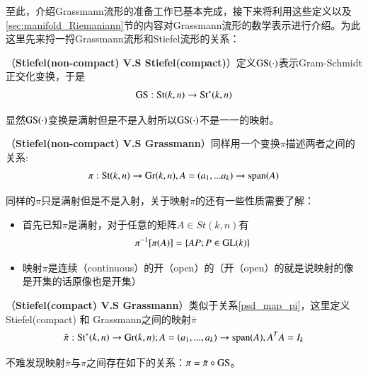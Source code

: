 至此，介绍Grassmann流形的准备工作已基本完成，接下来将利用这些定义以及\ref{sec:manifold_Riemaniann}节的内容对Grassmann流形的数学表示进行介绍。为此这里先来捋一捋Grassmann流形和Stiefel流形的关系：
\begin{rela}
\label{Relation_SS}
{\heiti （\textbf{Stiefel(non-compact) V.S Stiefel(compact)}）}定义${\rm GS}(\cdot)$表示Gram-Schmidt正交化变换，于是\begin{equation}
{\rm GS}:{\rm St}(k,n) \rightarrow {\rm St}^{*}(k,n)
\end{equation}
\end{rela}
显然${\rm GS}(\cdot)$变换是满射但是不是入射所以${\rm GS}(\cdot)$不是一一的映射。
\begin{rela}
\label{psd_map_pi}
{\heiti （\textbf{Stiefel(non-compact) V.S Grassmann}）}同样用一个变换$\pi$描述两者之间的关系:
\begin{equation}
\pi:{\rm St}(k,n) \rightarrow {\rm Gr}(k,n),A=(a_1,...a_k)\rightarrow {\rm{span}}(A)
\end{equation}
\end{rela}
同样的$\pi$只是满射但是不是入射，关于映射$\pi$的还有一些性质需要了解：
\begin{itemize}
\item 首先已知$\pi$是满射，对于任意的矩阵$A \in St(k,n)$有
\begin{equation}
\pi^{-1}[\pi(A)]=\{AP;P\in {\rm GL}(k)\}
\end{equation}
\item 映射$\pi$是连续（continuous）的开（open）的（开（open）的就是说映射的像是开集的话原像也是开集）
\end{itemize}
\begin{rela}
{\heiti （\textbf{Stiefel(compact) V.S Grassmann}）}类似于关系\ref{psd_map_pi}，这里定义Stiefel(compact) 和 Grassmann之间的映射$\bar{\pi}$
\begin{equation}
\bar{\pi}:{\rm St}^{*}(k,n)\rightarrow {\rm Gr}(k,n);A=(a_1,...,a_k)\rightarrow {\rm{span}}(A),A^{T}A=I_k 
\end{equation}
\end{rela}
不难发现映射$\bar{\pi}$与$\pi$之间存在如下的关系：$\pi=\bar{\pi}\circ {\rm GS}$。

